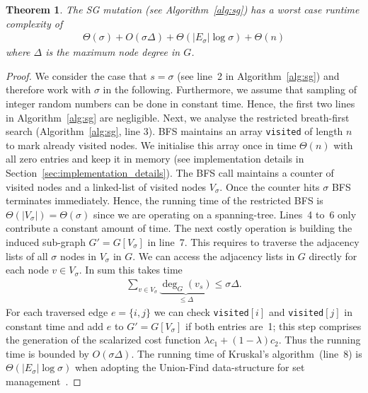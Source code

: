 \documentclass[twoside]{article}
\newtheorem{theorem}{Theorem}
\newtheorem{proof}{Proof}
\begin{document}
\begin{theorem}
\label{thm:runtime_sg}
The SG mutation (see Algorithm~\ref{alg:sg}) has a worst case runtime complexity of
\begin{align*}
    \Theta(\sigma) + O(\sigma\Delta) + \Theta(|E_{\sigma}|\log \sigma) + \Theta(n)
\end{align*}
where $\Delta$ is the maximum node degree in $G$. 
\end{theorem}
\begin{proof}
We consider the case that $s = \sigma$ (see line~2 in Algorithm~\ref{alg:sg}) and therefore work with $\sigma$ in the following. Furthermore, we assume that sampling of integer random numbers can be done in constant time. Hence, the first two lines in Algorithm~\ref{alg:sg} are negligible. 
Next, we analyse the restricted breath-first search (Algorithm~\ref{alg:sg}, line 3). BFS maintains an array \verb+visited+ of length $n$ to mark already visited nodes. We initialise this array once in time $\Theta(n)$ with all zero entries and keep it in memory (see implementation details in Section~\ref{sec:implementation_details}). The BFS call maintains a counter of visited nodes and a linked-list of visited nodes $V_{\sigma}$. Once the counter hits $\sigma$ BFS terminates immediately. Hence, the running time of the restricted BFS is $\Theta(|V_{\sigma}|) = \Theta(\sigma)$ since we are operating on a spanning-tree. 
Lines~4 to~6 only contribute a constant amount of time.
The next costly operation is building the induced sub-graph $G' = G[V_{\sigma}]$ in line~7. This requires to traverse the adjacency lists of all $\sigma$ nodes in $V_\sigma$ in $G$. We can access the adjacency lists in $G$ directly for each node $v \in V_{\sigma}$. In sum this takes time
\begin{align*}
    \sum_{v \in V_{\sigma}} \underbrace{\deg_G(v_s)}_{\leq \Delta} \leq \sigma\Delta.
\end{align*}
For each traversed edge $e = \{i,j\}$ we can check \verb+visited+$[i]$ and \verb+visited+$[j]$ in constant time and add $e$ to $G' = G[V_{\sigma}]$ if both entries are~1; this step comprises the generation of the scalarized cost function $\lambda c_1 + (1-\lambda)c_2$. Thus the running time is bounded by $O(\sigma \Delta)$.
The running time of Kruskal's algorithm~(line~8) is $\Theta(|E_{\sigma}| \log \sigma)$ when adopting the Union-Find data-structure for set management~\citep{tarjan1975SetUnion}.

\end{proof}
\end{document}
